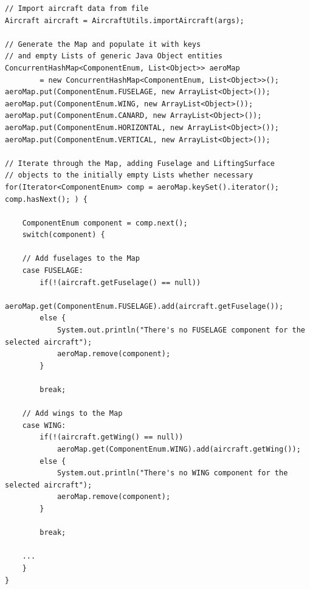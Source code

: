 %
\bigskip
\begin{lstlisting}[caption={Aircraft Map creation}, captionpos=b, tabsize=2, label={lst:AeroMap}]
// Import aircraft data from file
Aircraft aircraft = AircraftUtils.importAircraft(args);	

// Generate the Map and populate it with keys 
// and empty Lists of generic Java Object entities	
ConcurrentHashMap<ComponentEnum, List<Object>> aeroMap 
		= new ConcurrentHashMap<ComponentEnum, List<Object>>();
aeroMap.put(ComponentEnum.FUSELAGE, new ArrayList<Object>());
aeroMap.put(ComponentEnum.WING, new ArrayList<Object>());
aeroMap.put(ComponentEnum.CANARD, new ArrayList<Object>());
aeroMap.put(ComponentEnum.HORIZONTAL, new ArrayList<Object>());
aeroMap.put(ComponentEnum.VERTICAL, new ArrayList<Object>());

// Iterate through the Map, adding Fuselage and LiftingSurface  
// objects to the initially empty Lists whether necessary			
for(Iterator<ComponentEnum> comp = aeroMap.keySet().iterator(); comp.hasNext(); ) {
			
	ComponentEnum component = comp.next();
	switch(component) {
	
	// Add fuselages to the Map		
	case FUSELAGE:
		if(!(aircraft.getFuselage() == null))
			aeroMap.get(ComponentEnum.FUSELAGE).add(aircraft.getFuselage());
		else {
			System.out.println("There's no FUSELAGE component for the selected aircraft");
			aeroMap.remove(component);
		}
				
		break;
	
	// Add wings to the Map			
	case WING:
		if(!(aircraft.getWing() == null))
			aeroMap.get(ComponentEnum.WING).add(aircraft.getWing());
		else {
			System.out.println("There's no WING component for the selected aircraft");
			aeroMap.remove(component);
		}
				
		break;
				
	...
	}
}
\end{lstlisting}
%
\bigskip
